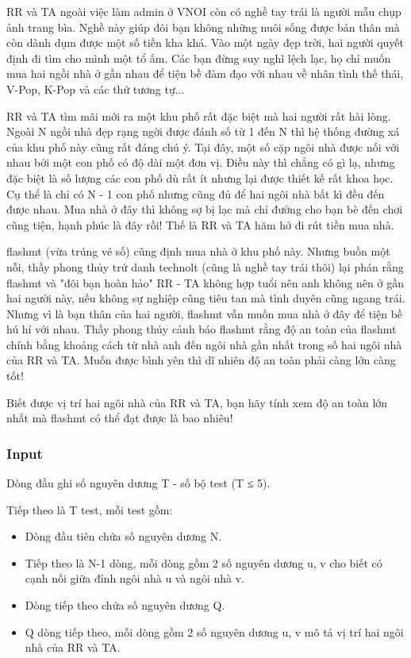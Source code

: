 



   RR và TA ngoài việc làm admin ở VNOI còn có nghề tay trái là người mẫu chụp ảnh trang bìa. Nghề này giúp đôi bạn không những nuôi sống được bản thân mà còn dành dụm được một số tiền kha khá. Vào một ngày đẹp trời, hai người quyết định đi tìm cho mình một tổ ấm. Các bạn đừng suy nghĩ lệch lạc, họ chỉ muốn mua hai ngồi nhà ở gần nhau để tiện bề đàm đạo với nhau về nhân tình thế thái, V-Pop, K-Pop và các thứ tương tự...  

   RR và TA tìm mãi mới ra một khu phố rất đặc biệt mà hai người rất hài lòng. Ngoài N ngồi nhà đẹp rạng ngời được đánh số từ 1 đến N thì hệ thống đường xá của khu phố này cũng rất đáng chú ý. Tại đây, một số cặp ngôi nhà được nối với nhau bởi một con phố có độ dài một đơn vị. Điều này thì chẳng có gì lạ, nhưng đặc biệt là số lượng các con phố dù rất ít nhưng lại được thiết kế rất khoa học. Cụ thể là chỉ có N - 1 con phố nhưng cũng đủ để hai ngôi nhà bất kì đều đến được nhau. Mua nhà ở đây thì không sợ bị lạc mà chỉ đường cho bạn bè đến chơi cũng tiện, hạnh phúc là đây rồi! Thế là RR và TA hăm hở đi rút tiền mua nhà.  

   flashmt (vừa trúng vé số) cũng định mua nhà ở khu phố này. Nhưng buồn một nỗi, thầy phong thủy trứ danh technolt (cũng là nghề tay trái thôi) lại phán rằng flashmt và "đôi bạn hoàn hảo" RR - TA không hợp tuổi nên anh không nên ở gần hai người này, nếu không sự nghiệp cũng tiêu tan mà tình duyên cũng ngang trái. Nhưng vì là bạn thân của hai người, flashmt vẫn muốn mua nhà ở đây để tiện bề hú hí với nhau. Thầy phong thủy cảnh báo flashmt rằng độ an toàn của flashmt chính bằng khoảng cách từ nhà anh đến ngôi nhà gần nhất trong số hai ngôi nhà của RR và TA. Muốn được bình yên thì dĩ nhiên độ an toàn phải càng lớn càng tốt!  

   Biết được vị trí hai ngôi nhà của RR và TA, bạn hãy tính xem độ an toàn lớn nhất mà flashmt có thể đạt được là bao nhiêu!  

\subsubsection{   Input  }

   Dòng đầu ghi số nguyên dương T - số bộ test (T ≤ 5).  

   Tiếp theo là T test, mỗi test gồm:  
\begin{itemize}
	\item     Dòng đầu tiên chứa số nguyên dương N.   
	\item     Tiếp theo là N-1 dòng, mỗi dòng gồm 2 số nguyên dương u, v cho biết có cạnh nối giữa đỉnh ngôi nhà u và ngôi nhà v.   
	\item     Dòng tiếp theo chứa số nguyên dương Q.   
	\item     Q dòng tiếp theo, mỗi dòng gồm 2 số nguyên dương u, v mô tả vị trí hai ngôi nhà của RR và TA.   
\end{itemize}

